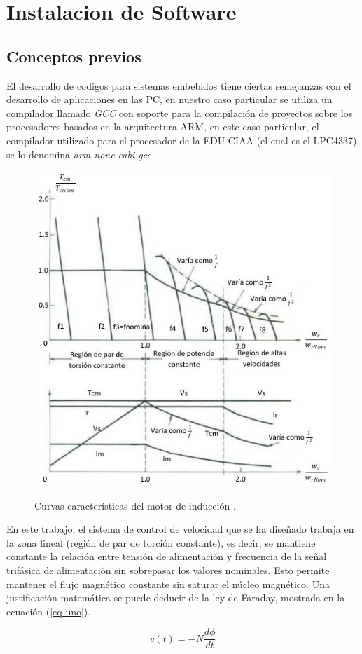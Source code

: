 \documentclass[conference]{IEEEtran}
\begin{document}
\section{Instalacion de Software}
\subsection{Conceptos previos}
El desarrollo de codigos para sistemas embebidos tiene ciertas semejanzas con el desarrollo de aplicaciones en las PC, en nuestro caso particular se utiliza un compilador llamado \textit{GCC} con soporte para la compilación de proyectos sobre los procesadores basados en la arquitectura ARM, en este caso particular, el compilador utilizado para el procesador de la EDU CIAA (el cual es el LPC4337) se lo denomina \textit{arm-none-eabi-gcc}

\begin{figure}[!t]
\centering
\includegraphics[width=8 cm]{figuras/CurvasMotorInduc.jpeg}\\
\caption{Curvas características del motor de inducción \cite{Mohan}.}
\label{fig_V/F}
\end{figure}

En este trabajo, el sistema de control de velocidad que se ha diseñado trabaja en la zona lineal (región de par de torción constante), es decir, se mantiene constante la relación entre tensión de alimentación y frecuencia de la señal trifásica de alimentación sin sobrepasar los valores nominales. Esto permite mantener el flujo magnético constante sin saturar el núcleo magnético. Una justificación matemática se puede deducir de la ley de Faraday, mostrada en la ecuación (\ref{eq-uno}).

\begin{equation}
v\left( t\right)=-N\dfrac{d\phi}{dt}\label{eq-uno}
\end{equation}
\end{document}
